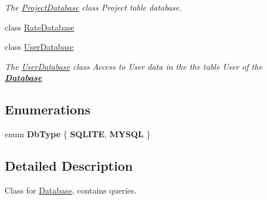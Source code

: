 \begin{DoxyCompactItemize}
\begin{DoxyCompactList}\small\item\em The \hyperlink{classDatabases_1_1ProjectDatabase}{Project\-Database} class Project table database. \end{DoxyCompactList}\item 
class \hyperlink{classDatabases_1_1RateDatabase}{Rate\-Database}
\item 
class \hyperlink{classDatabases_1_1UserDatabase}{User\-Database}
\begin{DoxyCompactList}\small\item\em The \hyperlink{classDatabases_1_1UserDatabase}{User\-Database} class Access to User data in the the table User of the {\bfseries \hyperlink{classDatabases_1_1Database}{Database}} \end{DoxyCompactList}\end{DoxyCompactItemize}
\subsection*{Enumerations}
\begin{DoxyCompactItemize}
\item 
enum {\bfseries Db\-Type} \{ {\bfseries S\-Q\-L\-I\-T\-E}, 
{\bfseries M\-Y\-S\-Q\-L}
 \}
\end{DoxyCompactItemize}


\subsection{Detailed Description}
Class for \hyperlink{classDatabases_1_1Database}{Database}, contains queries. 